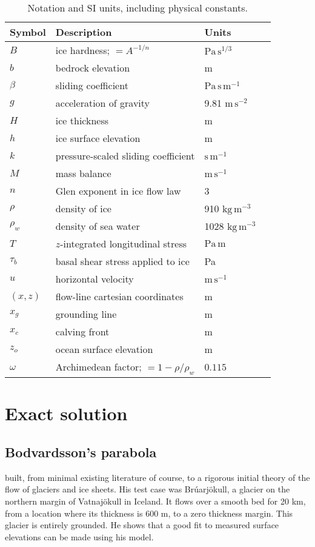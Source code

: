 \documentclass[review,letterpaper]{igs}
\begin{document}
\begin{table}
\caption{Notation and SI units, including physical constants.}\label{tab:notation}

\medskip
\begin{tabular}{llll}
Symbol & Description & Units \\ \hline
$B$ & ice hardness; $=A^{-1/n}$ & $\text{Pa}\,\text{s}^{1/3}$  \\
$b$ & bedrock elevation & m \\
$\beta$ & sliding coefficient & $\text{Pa}\,\text{s}\,\text{m}^{-1}$ \\
$g$ & acceleration of gravity  & 9.81 $\text{m}\,\text{s}^{-2}$\\
$H$ & ice thickness & m \\
$h$ & ice surface elevation & m \\
$k$ & pressure-scaled sliding coefficient  & $\text{s}\,\text{m}^{-1}$ \\
$M$ & mass balance & $\text{m}\,\text{s}^{-1}$ \\
$n$ & Glen exponent in ice flow law & 3 \\
$\rho$ & density of ice & 910 $\text{kg}\,\text{m}^{-3}$ \\
$\rho_w$ & density of sea water & 1028 $\text{kg}\,\text{m}^{-3}$ \\
$T$ & $z$-integrated longitudinal stress & $\text{Pa}\,\text{m}$ \\
$\tau_{b}$ & basal shear stress applied to ice & Pa \\
$u$ & horizontal velocity & $\text{m}\,\text{s}^{-1}$ \\
$(x,z)$ & flow-line cartesian coordinates & m  \\
$x_g$ & grounding line & m  \\
$x_c$ & calving front & m  \\
$z_o$ & ocean surface elevation & m \\
$\omega$ & Archimedean factor; $=1 - \rho/\rho_w$ & $0.115$
\end{tabular}
\end{table}


\section{Exact solution}

\subsection*{Bodvardsson's parabola}  \cite{Bodvardsson} built, from minimal existing literature of course, to a rigorous initial theory of the flow of glaciers and ice sheets.  His test case was Br\'uarj\"okull, a glacier on the northern margin of Vatnaj\"okull in Iceland.  It flows over a smooth bed for 20 km, from a location where its thickness is 600 m, to a zero thickness margin.  This glacier is entirely grounded.  He shows that a good fit to measured surface elevations can be made using his model.
\end{document}
